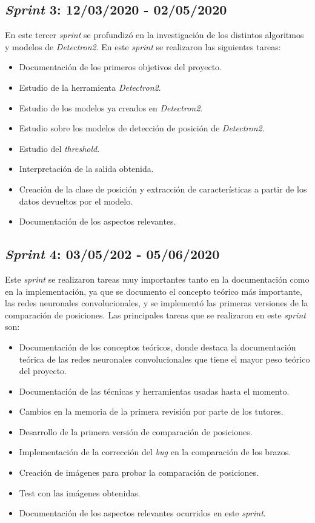 \subsection{\textit{Sprint} 3: 12/03/2020 - 02/05/2020}
En este tercer \textit{sprint} se profundizó en la investigación de los distintos algoritmos y modelos de \textit{Detectron2}. En este \textit{sprint} se realizaron las siguientes tareas:
\begin{itemize}
	\item Documentación de los primeros objetivos del proyecto.
	\item Estudio de la herramienta \textit{Detectron2}.
	\item Estudio de los modelos ya creados en \textit{Detectron2}.
	\item Estudio sobre los modelos de detección de posición de \textit{Detectron2}.
	\item Estudio del \textit{threshold}.
	\item Interpretación de la salida obtenida.
	\item Creación de la clase de posición y extracción de características a partir de los datos devueltos por el modelo.
	\item Documentación de los aspectos relevantes.
\end{itemize}

\subsection{\textit{Sprint} 4: 03/05/202 - 05/06/2020}
Este \textit{sprint} se realizaron tareas muy importantes tanto en la documentación como en la implementación, ya que se documento el concepto teórico más importante, las redes neuronales convolucionales, y se implementó las primeras versiones de la comparación de posiciones. Las principales tareas que se realizaron en este \textit{sprint} son:
\begin{itemize}
	\item Documentación de los conceptos teóricos, donde destaca la documentación teórica de las redes neuronales convolucionales que tiene el mayor peso teórico del proyecto.
	\item Documentación de las técnicas y herramientas usadas hasta el momento.
	\item Cambios en la memoria de la primera revisión por parte de los tutores.
	\item Desarrollo de la primera versión de comparación de posiciones.
	\item Implementación de la corrección del \textit{bug} en la comparación de los brazos.
	\item Creación de imágenes para probar la comparación de posiciones.
	\item Test con las imágenes obtenidas.
	\item Documentación de los aspectos relevantes ocurridos en este \textit{sprint}. 
\end{itemize}


